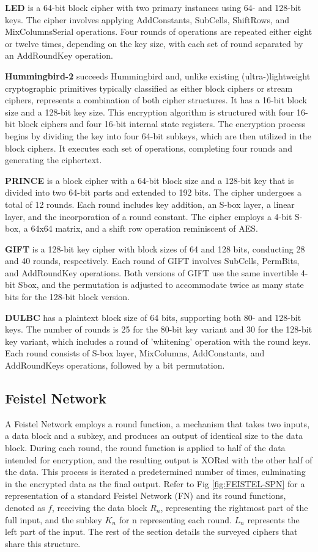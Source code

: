 \documentclass[conference,compsoc]{IEEEtran}
\begin{document}
\textbf{LED} is a 64-bit block cipher with two primary instances using 64- and 128-bit keys. The cipher involves applying AddConstants, SubCells, ShiftRows, and MixColumnsSerial operations. Four rounds of operations are repeated either eight or twelve times, depending on the key size, with each set of round separated by an AddRoundKey operation.

\textbf{Hummingbird-2} succeeds Hummingbird and, unlike existing (ultra-)lightweight cryptographic primitives typically classified as either block ciphers or stream ciphers, represents a combination of both cipher structures. It has a 16-bit block size and a 128-bit key size. This encryption algorithm is structured with four 16-bit block ciphers and four 16-bit internal state registers. The encryption process begins by dividing the key into four 64-bit subkeys, which are then utilized in the block ciphers. It executes each set of operations, completing four rounds and generating the ciphertext.

\textbf{PRINCE} is a block cipher with a 64-bit block size and a 128-bit key that is divided into two 64-bit parts and extended to 192 bits. The cipher undergoes a total of 12 rounds. Each round includes key addition, an S-box layer, a linear layer, and the incorporation of a round constant. The cipher employs a 4-bit S-box, a 64x64 matrix, and a shift row operation reminiscent of AES.

\textbf{GIFT} is a 128-bit key cipher with block sizes of 64 and 128 bits, conducting 28 and 40 rounds, respectively. Each round of GIFT involves SubCells, PermBits, and AddRoundKey operations. Both versions of GIFT use the same invertible 4-bit Sbox, and the permutation is adjusted to accommodate twice as many state bits for the 128-bit block version.

\textbf{DULBC} has a plaintext block size of 64 bits, supporting both 80- and 128-bit keys. The number of rounds is 25 for the 80-bit key variant and 30 for the 128-bit key variant, which includes a round of 'whitening' operation with the round keys. Each round consists of S-box layer, MixColumns, AddConstants, and AddRoundKeys operations, followed by a bit permutation.


\subsection{Feistel Network} 

A Feistel Network employs a round function, a mechanism that takes two inputs, a data block and a subkey, and produces an output of identical size to the data block. During each round, the round function is applied to half of the data intended for encryption, and the resulting output is XORed with the other half of the data. This process is iterated a predetermined number of times, culminating in the encrypted data as the final output\cite{FEISTEL}. Refer to Fig \ref{fig:FEISTEL-SPN} for a representation of a standard Feistel Network (FN) and its round functions, denoted as $f$, receiving the data block $R_n$, representing the rightmost part of the full input, and the subkey $K_n$ for n representing each round. $L_n$ represents the left part of the input. The rest of the section details the surveyed ciphers that share this structure.
\end{document}
